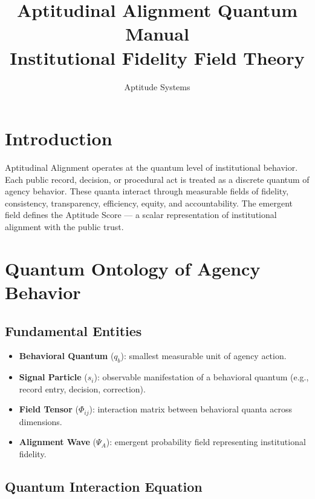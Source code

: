 \documentclass[a4paper,11pt]{article}
\title{Aptitudinal Alignment Quantum Manual \\ Institutional Fidelity Field Theory}
\author{Aptitude Systems}
\begin{document}
	
	\maketitle
	\tableofcontents
	\lstlistoflistings
	\newpage
	
	\section{Introduction}
	
	Aptitudinal Alignment operates at the quantum level of institutional behavior.  
	Each public record, decision, or procedural act is treated as a discrete quantum of agency behavior.  
	These quanta interact through measurable fields of fidelity, consistency, transparency, efficiency, equity, and accountability.  
	The emergent field defines the Aptitude Score — a scalar representation of institutional alignment with the public trust.
	
	\section{Quantum Ontology of Agency Behavior}
	
	\subsection{Fundamental Entities}
	
	\begin{itemize}
		\item \textbf{Behavioral Quantum} (\(q_b\)): smallest measurable unit of agency action.
		\item \textbf{Signal Particle} (\(s_i\)): observable manifestation of a behavioral quantum (e.g., record entry, decision, correction).
		\item \textbf{Field Tensor} (\(\Phi_{ij}\)): interaction matrix between behavioral quanta across dimensions.
		\item \textbf{Alignment Wave} (\(\Psi_A\)): emergent probability field representing institutional fidelity.
	\end{itemize}
	
	\subsection{Quantum Interaction Equation}
	
\end{document}
